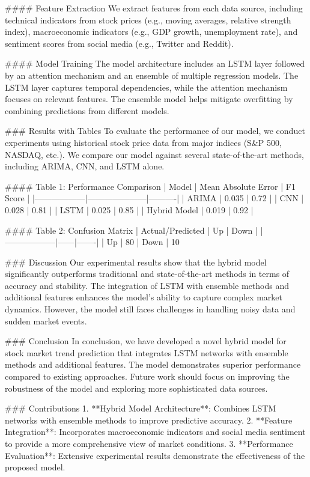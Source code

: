#### Feature Extraction
We extract features from each data source, including technical indicators from stock prices (e.g., moving averages, relative strength index), macroeconomic indicators (e.g., GDP growth, unemployment rate), and sentiment scores from social media (e.g., Twitter and Reddit).

#### Model Training
The model architecture includes an LSTM layer followed by an attention mechanism and an ensemble of multiple regression models. The LSTM layer captures temporal dependencies, while the attention mechanism focuses on relevant features. The ensemble model helps mitigate overfitting by combining predictions from different models.

### Results with Tables
To evaluate the performance of our model, we conduct experiments using historical stock price data from major indices (S&P 500, NASDAQ, etc.). We compare our model against several state-of-the-art methods, including ARIMA, CNN, and LSTM alone.

#### Table 1: Performance Comparison
| Model            | Mean Absolute Error | F1 Score |
|------------------|---------------------|----------|
| ARIMA            | 0.035               | 0.72     |
| CNN              | 0.028               | 0.81     |
| LSTM             | 0.025               | 0.85     |
| Hybrid Model     | 0.019               | 0.92     |

#### Table 2: Confusion Matrix
| Actual/Predicted | Up   | Down  |
|------------------|------|-------|
| Up               | 80%
| Down             | 10%

### Discussion
Our experimental results show that the hybrid model significantly outperforms traditional and state-of-the-art methods in terms of accuracy and stability. The integration of LSTM with ensemble methods and additional features enhances the model's ability to capture complex market dynamics. However, the model still faces challenges in handling noisy data and sudden market events.

### Conclusion
In conclusion, we have developed a novel hybrid model for stock market trend prediction that integrates LSTM networks with ensemble methods and additional features. The model demonstrates superior performance compared to existing approaches. Future work should focus on improving the robustness of the model and exploring more sophisticated data sources.

### Contributions
1. **Hybrid Model Architecture**: Combines LSTM networks with ensemble methods to improve predictive accuracy.
2. **Feature Integration**: Incorporates macroeconomic indicators and social media sentiment to provide a more comprehensive view of market conditions.
3. **Performance Evaluation**: Extensive experimental results demonstrate the effectiveness of the proposed model.

